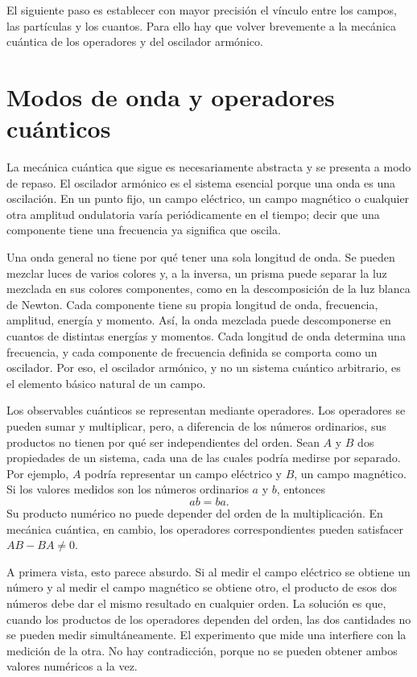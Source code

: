 El siguiente paso es establecer con mayor precisión el vínculo entre los campos, las partículas y los cuantos. Para ello hay que volver brevemente a la mecánica cuántica de los operadores y del oscilador armónico.

\section{Modos de onda y operadores cuánticos}

La mecánica cuántica que sigue es necesariamente abstracta y se presenta a modo de repaso. El oscilador armónico es el sistema esencial porque una onda es una oscilación. En un punto fijo, un campo eléctrico, un campo magnético o cualquier otra amplitud ondulatoria varía periódicamente en el tiempo; decir que una componente tiene una frecuencia ya significa que oscila.

Una onda general no tiene por qué tener una sola longitud de onda. Se pueden mezclar luces de varios colores y, a la inversa, un prisma puede separar la luz mezclada en sus colores componentes, como en la descomposición de la luz blanca de Newton. Cada componente tiene su propia longitud de onda, frecuencia, amplitud, energía y momento. Así, la onda mezclada puede descomponerse en cuantos de distintas energías y momentos. Cada longitud de onda determina una frecuencia, y cada componente de frecuencia definida se comporta como un oscilador. Por eso, el oscilador armónico, y no un sistema cuántico arbitrario, es el elemento básico natural de un campo.

Los observables cuánticos se representan mediante operadores. Los operadores se pueden sumar y multiplicar, pero, a diferencia de los números ordinarios, sus productos no tienen por qué ser independientes del orden. Sean \(A\) y \(B\) dos propiedades de un sistema, cada una de las cuales podría medirse por separado. Por ejemplo, \(A\) podría representar un campo eléctrico y \(B\), un campo magnético. Si los valores medidos son los números ordinarios \(a\) y \(b\), entonces
\begin{equation}
ab=ba.
\end{equation}
Su producto numérico no puede depender del orden de la multiplicación. En mecánica cuántica, en cambio, los operadores correspondientes pueden satisfacer \(AB-BA\neq0\).

A primera vista, esto parece absurdo. Si al medir el campo eléctrico se obtiene un número y al medir el campo magnético se obtiene otro, el producto de esos dos números debe dar el mismo resultado en cualquier orden. La solución es que, cuando los productos de los operadores dependen del orden, las dos cantidades no se pueden medir simultáneamente. El experimento que mide una interfiere con la medición de la otra. No hay contradicción, porque no se pueden obtener ambos valores numéricos a la vez.

